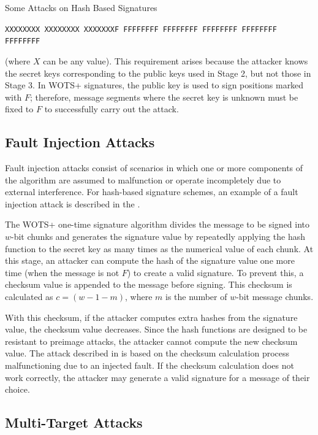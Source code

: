 \documentclass [version=submission]{iacrcc}
\begin{document}
\begin{section}{Some Attacks on Hash Based Signatures}
\begin{center}
\texttt{XXXXXXXX XXXXXXXX XXXXXXXF FFFFFFFF FFFFFFFF FFFFFFFF FFFFFFFF FFFFFFFF}
\end{center}

(where \( X \) can be any value). This requirement arises because the attacker knows the secret keys corresponding to the public keys used in Stage 2, but not those in Stage 3. In WOTS+ signatures, the public key is used to sign positions marked with \( F \); therefore, message segments where the secret key is unknown must be fixed to \( F \) to successfully carry out the attack.

\subsection{Fault Injection Attacks}

Fault injection attacks consist of scenarios in which one or more components of the algorithm are assumed to malfunction or operate incompletely due to external interference. For hash-based signature schemes, an example of a fault injection attack is described in the \cite{wagner2023faulting}.

The WOTS+ one-time signature algorithm divides the message to be signed into $w$-bit chunks and generates the signature value by repeatedly applying the hash function to the secret key as many times as the numerical value of each chunk. At this stage, an attacker can compute the hash of the signature value one more time (when the message is not $F$) to create a valid signature. To prevent this, a checksum value is appended to the message before signing. This checksum is calculated as $c = (w - 1 - m)$, where $m$ is the number of $w$-bit message chunks.

With this checksum, if the attacker computes extra hashes from the signature value, the checksum value decreases. Since the hash functions are designed to be resistant to preimage attacks, the attacker cannot compute the new checksum value. The attack described in \cite{wagner2023faulting} is based on the checksum calculation process malfunctioning due to an injected fault. If the checksum calculation does not work correctly, the attacker may generate a valid signature for a message of their choice.

\subsection{Multi-Target Attacks}


\end{section}
\end{document}
